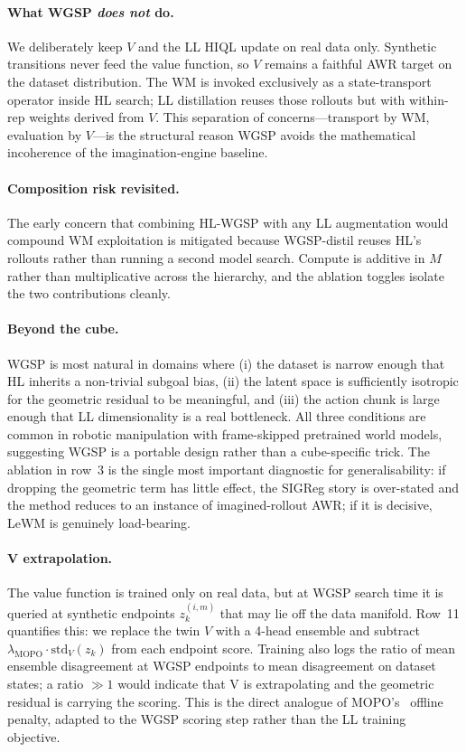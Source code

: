 \paragraph{What WGSP \emph{does not} do.}
We deliberately keep $V$ and the LL HIQL update on real data only.
Synthetic transitions never feed the value function, so $V$ remains a
faithful AWR target on the dataset distribution. The WM is invoked
exclusively as a state-transport operator inside HL search; LL
distillation reuses those rollouts but with within-rep weights derived
from $V$. This separation of concerns---transport by WM, evaluation by
$V$---is the structural reason WGSP avoids the mathematical
incoherence of the imagination-engine baseline.

\paragraph{Composition risk revisited.}
The early concern that combining HL-WGSP with any LL augmentation would
compound WM exploitation is mitigated because WGSP-distil reuses HL's
rollouts rather than running a second model search. Compute is
additive in $M$ rather than multiplicative across the hierarchy, and
the ablation toggles isolate the two contributions cleanly.

\paragraph{Beyond the cube.}
WGSP is most natural in domains where (i) the dataset is narrow enough
that HL inherits a non-trivial subgoal bias, (ii) the latent space is
sufficiently isotropic for the geometric residual to be meaningful,
and (iii) the action chunk is large enough that LL dimensionality is a
real bottleneck. All three conditions are common in robotic
manipulation with frame-skipped pretrained world models, suggesting
WGSP is a portable design rather than a cube-specific trick. The
ablation in row~3 is the single most important diagnostic for
generalisability: if dropping the geometric term has little effect, the
SIGReg story is over-stated and the method reduces to an instance of
imagined-rollout AWR; if it is decisive, LeWM is genuinely
load-bearing.

\paragraph{V extrapolation.}
The value function is trained only on real data, but at WGSP search
time it is queried at synthetic endpoints $z_k^{(i,m)}$ that may lie
off the data manifold. Row~11 quantifies this: we replace the twin $V$
with a 4-head ensemble and subtract $\lambda_\text{MOPO}
\cdot\mathrm{std}_V(z_k)$ from each endpoint score. Training also logs
the ratio of mean ensemble disagreement at WGSP endpoints to mean
disagreement on dataset states; a ratio $\gg 1$ would indicate that V
is extrapolating and the geometric residual is carrying the scoring.
This is the direct analogue of MOPO's~\citep{mopo} offline penalty,
adapted to the WGSP scoring step rather than the LL training objective.

